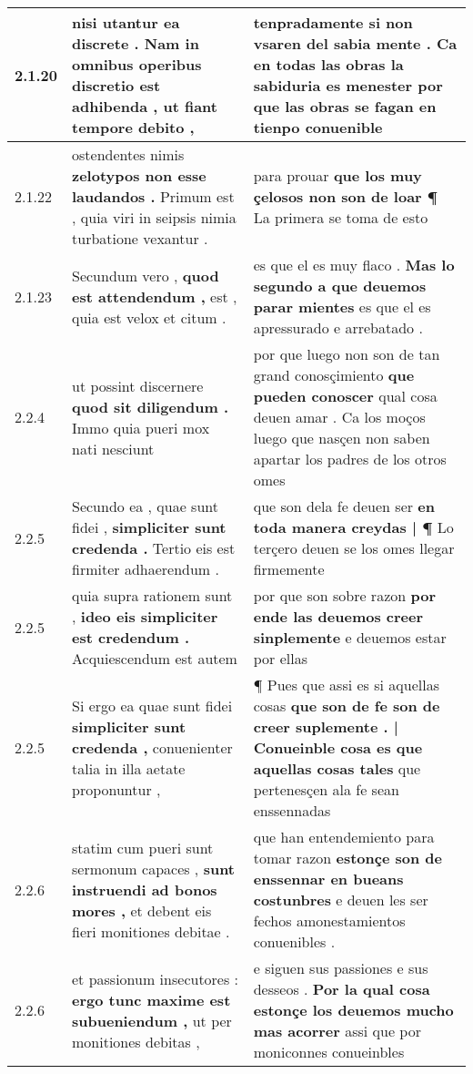 \begin{tabular}{|p{1cm}|p{6.5cm}|p{6.5cm}|}
2.1.20 & nisi utantur ea discrete . \textbf{ Nam in omnibus operibus discretio est adhibenda , } ut fiant tempore debito , & tenpradamente si non vsaren del sabia mente . \textbf{ Ca en todas las obras la sabiduria es menester } por que las obras se fagan en tienpo conuenible \\\hline
2.1.22 & ostendentes nimis \textbf{ zelotypos non esse laudandos . } Primum est , quia viri in seipsis nimia turbatione vexantur . & para prouar \textbf{ que los muy çelosos non son de loar ¶ } La primera se toma de esto \\\hline
2.1.23 & Secundum vero , \textbf{ quod est attendendum , } est , quia est velox et citum . & es que el es muy flaco . \textbf{ Mas lo segundo a que deuemos parar mientes } es que el es apressurado e arrebatado . \\\hline
2.2.4 & ut possint discernere \textbf{ quod sit diligendum . } Immo quia pueri mox nati nesciunt & por que luego non son de tan grand conosçimiento \textbf{ que pueden conoscer } qual cosa deuen amar . Ca los moços luego que nasçen non saben apartar los padres de los otros omes \\\hline
2.2.5 & Secundo ea , quae sunt fidei , \textbf{ simpliciter sunt credenda . } Tertio eis est firmiter adhaerendum . & que son dela fe deuen ser \textbf{ en toda manera creydas | ¶ } Lo terçero deuen se los omes llegar firmemente \\\hline
2.2.5 & quia supra rationem sunt , \textbf{ ideo eis simpliciter est credendum . } Acquiescendum est autem & por que son sobre razon \textbf{ por ende las deuemos creer sinplemente } e deuemos estar por ellas \\\hline
2.2.5 & Si ergo ea quae sunt fidei \textbf{ simpliciter sunt credenda , } conuenienter talia in illa aetate proponuntur , & ¶ Pues que assi es si aquellas cosas \textbf{ que son de fe son de creer suplemente . | Conueinble cosa es que aquellas cosas tales } que pertenesçen ala fe sean enssennadas \\\hline
2.2.6 & statim cum pueri sunt sermonum capaces , \textbf{ sunt instruendi ad bonos mores , } et debent eis fieri monitiones debitae . & que han entendemiento para tomar razon \textbf{ estonçe son de enssennar en bueans costunbres } e deuen les ser fechos amonestamientos conuenibles . \\\hline
2.2.6 & et passionum insecutores : \textbf{ ergo tunc maxime est subueniendum , } ut per monitiones debitas , & e siguen sus passiones e sus desseos . \textbf{ Por la qual cosa estonçe los deuemos mucho mas acorrer } assi que por moniconnes conueinbles \\\hline

\end{tabular}
